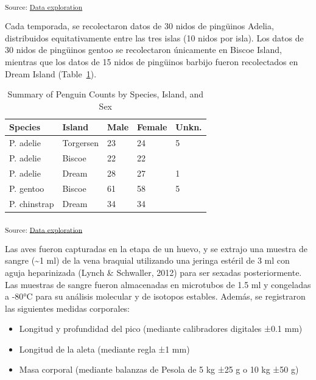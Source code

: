 \documentclass[
]{agujournal2019}
\providecommand{\tightlist}{%
  \setlength{\itemsep}{0pt}\setlength{\parskip}{0pt}}\usepackage{longtable,booktabs,array}
\begin{document}
\textsubscript{Source:
\href{https://quarto-ext.github.io/manuscript-template-rstudio/notebooks/DataExploration-preview.html\#cell-fig-mapa-distribucion}{Data
exploration}}

Cada temporada, se recolectaron datos de 30 nidos de pingüinos Adelia,
distribuidos equitativamente entre las tres islas (10 nidos por isla).
Los datos de 30 nidos de pingüinos gentoo se recolectaron únicamente en
Biscoe Island, mientras que los datos de 15 nidos de pingüinos barbijo
fueron recolectados en Dream Island (Table~\ref{tbl-sampling}).

\begin{longtable}[]{@{}lllll@{}}

\caption{\label{tbl-sampling}Summary of Penguin Counts by Species,
Island, and Sex}

\tabularnewline

\toprule\noalign{}
Species & Island & Male & Female & Unkn. \\
\midrule\noalign{}
\endhead
\bottomrule\noalign{}
\endlastfoot
P. adelie & Torgersen & 23 & 24 & 5 \\
P. adelie & Biscoe & 22 & 22 & \\
P. adelie & Dream & 28 & 27 & 1 \\
P. gentoo & Biscoe & 61 & 58 & 5 \\
P. chinstrap & Dream & 34 & 34 & \\

\end{longtable}

\textsubscript{Source:
\href{https://quarto-ext.github.io/manuscript-template-rstudio/notebooks/DataExploration-preview.html\#cell-tbl-sampling}{Data
exploration}}

Las aves fueron capturadas en la etapa de un huevo, y se extrajo una
muestra de sangre (\textasciitilde1 ml) de la vena braquial utilizando
una jeringa estéril de 3 ml con aguja heparinizada (Lynch \& Schwaller,
2012) para ser sexadas posteriormente. Las muestras de sangre fueron
almacenadas en microtubos de 1.5 ml y congeladas a -80°C para su
análisis molecular y de isotopos estables. Además, se registraron las
siguientes medidas corporales:

\begin{itemize}
\tightlist
\item
  Longitud y profundidad del pico (mediante calibradores digitales ±0.1
  mm)\\
\item
  Longitud de la aleta (mediante regla ±1 mm)\\
\item
  Masa corporal (mediante balanzas de Pesola de 5 kg ±25 g o 10 kg ±50
  g)
\end{itemize}
\end{document}
